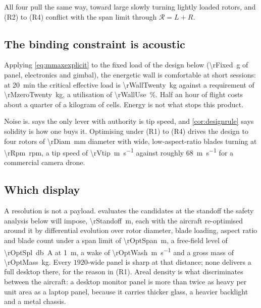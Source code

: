 All four pull the same way, toward large slowly turning lightly loaded rotors,
and (R2) to (R4) conflict with the span limit through $\mathcal{R}=L+R$.

\subsection{The binding constraint is acoustic}

Applying \cref{eq:mmaxexplicit} to the fixed load of the design below
(\SI{\rFixed}{\gram} of panel, electronics and gimbal), the energetic wall is
comfortable at short sessions: at \SI{20}{\minute} the critical effective load
is \SI{\rWallTwenty}{\kilo\gram} against a requirement of
\SI{\rMzeroTwenty}{\kilo\gram}, a utilisation of \SI{\rWallUse}{\percent}.
Half an hour of flight costs about a quarter of a kilogram of cells. Energy
is not what stops this product.

Noise is.  says the only lever with authority is tip
speed, and \cref{cor:designrule} says solidity is how one buys it. Optimising
under (R1) to (R4) drives the design to four rotors of
\SI{\rDiam}{\milli\metre} diameter with wide, low-aspect-ratio blades turning
at \SI{\rRpm}{rpm}, a tip speed of \SI{\rVtip}{\metre\per\second} against
roughly \SI{68}{\metre\per\second} for a commercial camera drone.

\subsection{Which display}

A resolution is not a payload.  evaluates the candidates at
the standoff the safety analysis below will impose, \SI{\rStandoff}{\metre},
each with the aircraft re-optimised around it by differential evolution over
rotor diameter, blade loading, aspect ratio and blade count under a span limit
of \SI{\rOptSpan}{\metre}, a free-field level of \SI{\rOptSpl}{\decibel A} at
\SI{1}{\metre}, a wake of \SI{\rOptWash}{\metre\per\second} and a gross mass
of \SI{\rOptMass}{\kilo\gram}. Every $1920$-wide panel is sharp at that
distance; none delivers a full desktop there, for the reason in (R1). Areal
density is what discriminates between the aircraft: a desktop monitor panel is
more than twice as heavy per unit area as a laptop panel, because it carries
thicker glass, a heavier backlight and a metal chassis.

